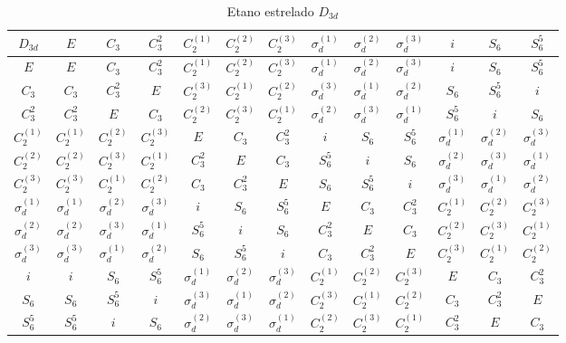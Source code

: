 \documentclass[a4paper,10pt]{article}
\begin{document}
\begin{table}[ht]
\caption{Etano estrelado $D_{3d}$}
\centering


\begin{tabular} { |c|c c c c c c c c c c c c | }
\hline
$D_{3d}$ & $E$ & $C_3$ & $C_3^2$ & $C_2^{(1)}$ & $C_2^{(2)}$ & $C_2^{(3)}$ & $\sigma_d^{(1)}$ & $\sigma_d^{(2)}$ & $\sigma_d^{(3)}$ & $i$ & $S_6$ & $S_6^5$ \\
\hline
$E$ & $E$ & $C_3$ & $C_3^2$ & $C_2^{(1)}$ & $C_2^{(2)}$ & $C_2^{(3)}$ & $\sigma_d^{(1)}$ & $\sigma_d^{(2)}$ & $\sigma_d^{(3)}$ & $i$ & $S_6$ & $S_6^5$ \\
$C_3$ & $C_3$ & $C_3^2$ & $E$ & $C_2^{(3)}$ & $C_2^{(1)}$ & $C_2^{(2)}$ & $\sigma_d^{(3)}$ & $\sigma_d^{(1)}$ & $\sigma_d^{(2)}$ & $S_6$ & $S_6^5$ & $i$ \\
$C_3^2$ & $C_3^2$ & $E$ & $C_3$ & $C_2^{(2)}$ & $C_2^{(3)}$ & $C_2^{(1)}$ & $\sigma_d^{(2)}$ & $\sigma_d^{(3)}$ & $\sigma_d^{(1)}$ & $S_6^5$ & $i$ & $S_6$ \\
$C_2^{(1)}$ & $C_2^{(1)}$ & $C_2^{(2)}$ & $C_2^{(3)}$ & $E$ & $C_3$ & $C_3^2$ & $i$ & $S_6$ & $S_6^5$ & $\sigma_d^{(1)}$ & $\sigma_d^{(2)}$ & $\sigma_d^{(3)}$ \\
$C_2^{(2)}$ & $C_2^{(2)}$ & $C_2^{(3)}$ & $C_2^{(1)}$ & $C_3^2$ & $E$ & $C_3$ & $S_6^5$ & $i$ & $S_6$ & $\sigma_d^{(2)}$ & $\sigma_d^{(3)}$ & $\sigma_d^{(1)}$ \\
$C_2^{(3)}$ & $C_2^{(3)}$ & $C_2^{(1)}$ & $C_2^{(2)}$ & $C_3$ & $C_3^2$ & $E$ & $S_6$ & $S_6^5$ & $i$ & $\sigma_d^{(3)}$ & $\sigma_d^{(1)}$ & $\sigma_d^{(2)}$ \\
$\sigma_d^{(1)}$ & $\sigma_d^{(1)}$ & $\sigma_d^{(2)}$ & $\sigma_d^{(3)}$ & $i$ & $S_6$ & $S_6^5$ & $E$ & $C_3$ & $C_3^2$ & $C_2^{(1)}$ & $C_2^{(2)}$ & $C_2^{(3)}$ \\
$\sigma_d^{(2)}$ & $\sigma_d^{(2)}$ & $\sigma_d^{(3)}$ & $\sigma_d^{(1)}$ & $S_6^5$ & $i$ & $S_6$ & $C_3^2$ & $E$ & $C_3$ & $C_2^{(2)}$ & $C_2^{(3)}$ & $C_2^{(1)}$ \\
$\sigma_d^{(3)}$ & $\sigma_d^{(3)}$ & $\sigma_d^{(1)}$ & $\sigma_d^{(2)}$ & $S_6$ & $S_6^5$ & $i$ & $C_3$ & $C_3^2$ & $E$ & $C_2^{(3)}$ & $C_2^{(1)}$ & $C_2^{(2)}$ \\
$i$ & $i$ & $S_6$ & $S_6^5$ & $\sigma_d^{(1)}$ & $\sigma_d^{(2)}$ & $\sigma_d^{(3)}$ & $C_2^{(1)}$ & $C_2^{(2)}$ & $C_2^{(3)}$ & $E$ & $C_3$ & $C_3^2$ \\
$S_6$ & $S_6$ & $S_6^5$ & $i$ & $\sigma_d^{(3)}$ & $\sigma_d^{(1)}$ & $\sigma_d^{(2)}$ & $C_2^{(3)}$ & $C_2^{(1)}$ & $C_2^{(2)}$ & $C_3$ & $C_3^2$ & $E$ \\
$S_6^5$ & $S_6^5$ & $i$ & $S_6$ & $\sigma_d^{(2)}$ & $\sigma_d^{(3)}$ & $\sigma_d^{(1)}$ & $C_2^{(2)}$ & $C_2^{(3)}$ & $C_2^{(1)}$ & $C_3^2$ & $E$ & $C_3$ \\
\hline
\end{tabular}

\label{tab:mult}
\end{table}
\end{document}
